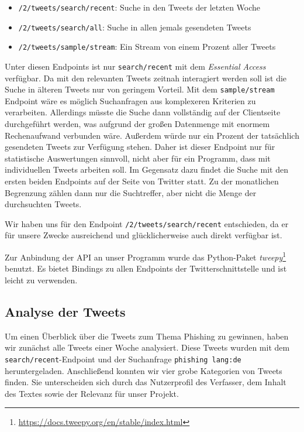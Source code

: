 \documentclass[runningheads]{llncs}
\begin{document}
\begin{itemize}
    \item \texttt{/2/tweets/search/recent}: Suche in den Tweets der letzten Woche
    \item \texttt{/2/tweets/search/all}: Suche in allen jemals gesendeten Tweets
    \item \texttt{/2/tweets/sample/stream}: Ein Stream von einem Prozent aller Tweets
\end{itemize}

Unter diesen Endpoints ist nur \texttt{search/recent} mit dem \textit{Essential Access} verfügbar.
Da mit den relevanten Tweets zeitnah interagiert werden soll ist die Suche in älteren Tweets nur von geringem Vorteil.
Mit dem \texttt{sample/stream} Endpoint wäre es möglich Suchanfragen aus komplexeren Kriterien zu verarbeiten.
Allerdings müsste die Suche dann vollständig auf der Clientseite durchgeführt werden, was aufgrund der großen Datenmenge mit enormem Rechenaufwand verbunden wäre.
Außerdem würde nur ein Prozent der tatsächlich gesendeten Tweets zur Verfügung stehen.
Daher ist dieser Endpoint nur für statistische Auswertungen sinnvoll, nicht aber für ein Programm, dass mit individuellen Tweets arbeiten soll.
Im Gegensatz dazu findet die Suche mit den ersten beiden Endpoints auf der Seite von Twitter statt.
Zu der monatlichen Begrenzung zählen dann nur die Suchtreffer, aber nicht die Menge der durchsuchten Tweets.

Wir haben uns für den Endpoint \texttt{/2/tweets/search/recent} entschieden, da er für unsere Zwecke ausreichend und glücklicherweise auch direkt verfügbar ist.

Zur Anbindung der API an unser Programm wurde das Python-Paket \textit{tweepy}\footnote{\url{https://docs.tweepy.org/en/stable/index.html}} benutzt.
Es bietet Bindings zu allen Endpoints der Twitterschnittstelle und ist leicht zu verwenden.

\subsection{Analyse der Tweets}
Um einen Überblick über die Tweets zum Thema Phishing zu gewinnen, haben wir zunächst alle Tweets einer Woche analysiert.
Diese Tweets wurden mit dem \texttt{search/recent}-Endpoint und der Suchanfrage \texttt{phishing lang:de} heruntergeladen.
Anschließend konnten wir vier grobe Kategorien von Tweets finden.
Sie unterscheiden sich durch das Nutzerprofil des Verfasser, dem Inhalt des Textes sowie der Relevanz für unser Projekt.
\end{document}

